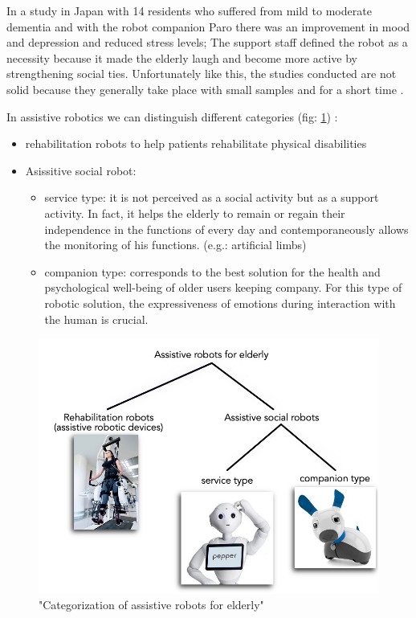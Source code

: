 \documentclass{thesisreport}
\begin{document}
 In a study in Japan with 14 residents who suffered from mild to moderate dementia and with the robot companion Paro there was an improvement in mood and depression and reduced stress levels; 
 The support staff defined the robot as a necessity because it made the elderly laugh and become more active by strengthening social ties.
 Unfortunately like this, the studies conducted are not solid because they generally take place with small samples and for a short time \cite{psicologicalEffects}.
 
 In assistive robotics we can distinguish different categories (fig: \ref{fig:layers}) \cite{assistiveRobots}:
 \begin{itemize}
     \item rehabilitation robots to help patients rehabilitate physical disabilities
     \item  Asissitive social robot:
     \begin{itemize}
         \item service type: it is not perceived as a social activity but as a support activity. In fact, it helps the elderly to remain or regain their independence in the functions of every day and contemporaneously allows the monitoring of his functions. (e.g.: artificial limbs)
         \item companion type: corresponds to the best solution for the health and psychological well-being of older users keeping company. For this type of robotic solution, the expressiveness of emotions during interaction with the human is crucial.
     \end{itemize}
 \end{itemize}
 
 \begin{figure}[h]
	\centering
	\includegraphics[width=14cm]{Thesis/data/TypeRobot.jpg}
	\caption{"Categorization of assistive robots for elderly" \cite{assistiveRobots}}
	\label{fig:layers}
 \end{figure}
 
\end{document}

